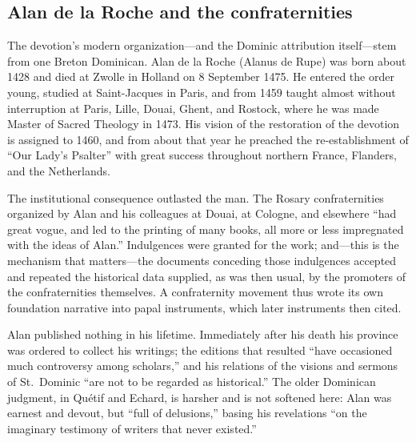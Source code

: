 \subsection{Alan de la Roche and the confraternities}

The devotion's modern organization---and the Dominic attribution
itself---stem from one Breton Dominican. Alan de la Roche (Alanus de
Rupe) was born about 1428 and died at Zwolle in Holland on 8 September
1475. He entered the order young, studied at Saint-Jacques in Paris, and
from 1459 taught almost without interruption at Paris, Lille, Douai,
Ghent, and Rostock, where he was made Master of Sacred Theology in 1473.
His vision of the restoration of the devotion is assigned to 1460, and
from about that year he preached the re-establishment of ``Our Lady's
Psalter'' with great success throughout northern France, Flanders, and
the Netherlands.

The institutional consequence outlasted the man. The Rosary
confraternities organized by Alan and his colleagues at Douai, at
Cologne, and elsewhere ``had great vogue, and led to the printing of
many books, all more or less impregnated with the ideas of Alan.''
Indulgences were granted for the work; and---this is the mechanism that
matters---the documents conceding those indulgences accepted and
repeated the historical data supplied, as was then usual, by the
promoters of the confraternities themselves. A confraternity movement
thus wrote its own foundation narrative into papal instruments, which
later instruments then cited.

Alan published nothing in his lifetime. Immediately after his death his
province was ordered to collect his writings; the editions that resulted
``have occasioned much controversy among scholars,'' and his relations
of the visions and sermons of St.~Dominic ``are not to be regarded as
historical.'' The older Dominican judgment, in Qu\'etif and Echard, is
harsher and is not softened here: Alan was earnest and devout, but ``full
of delusions,'' basing his revelations ``on the imaginary testimony of
writers that never existed.''

